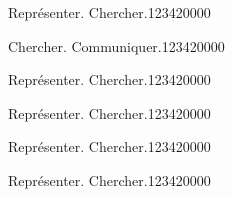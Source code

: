 \begin{pageAD}
\begin{ExoCad}{Représenter. Chercher.}{1234}{2}{0}{0}{0}{0}
 
\end{ExoCad}
 

\begin{ExoCad}{Chercher. Communiquer.}{1234}{2}{0}{0}{0}{0}
 
\end{ExoCad}


 
 
\begin{ExoCad}{Représenter. Chercher.}{1234}{2}{0}{0}{0}{0}
 
\end{ExoCad}

\begin{ExoCad}{Représenter. Chercher.}{1234}{2}{0}{0}{0}{0}
 
\end{ExoCad}

\begin{ExoCad}{Représenter. Chercher.}{1234}{2}{0}{0}{0}{0}
 
\end{ExoCad}

\begin{ExoCad}{Représenter. Chercher.}{1234}{2}{0}{0}{0}{0}
 
\end{ExoCad}


\end{pageAD}

